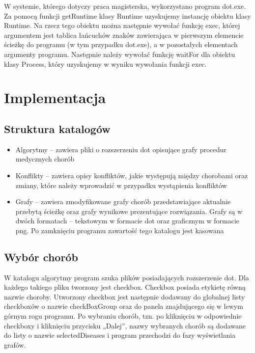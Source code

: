 \documentclass[oneside,a4paper]{book}
\begin{document}
\begin{spacing}{1.5}
W systemie, którego dotyczy praca magisterska, wykorzystano program dot.exe. Za pomocą funkcji getRuntime klasy Runtime uzyskujemy instancję obiektu klasy Runtime. Na rzecz tego obiektu można następnie wywołać funkcję exec, której argumentem jest tablica łańcuchów znaków zawierająca w pierwszym elemencie ścieżkę do programu (w tym przypadku dot.exe), a w pozostałych elementach argumenty programu. Następnie należy wywołać funkcję waitFor dla obiektu klasy Process, który uzyskujemy w wyniku wywołania funkcji exec.

\chapter{Implementacja}

\section{Struktura katalogów}

\begin{itemize}
\item{Algorytmy – zawiera pliki o rozszerzeniu dot opisujące grafy procedur medycznych chorób}
\item{Konflikty – zawiera opisy konfliktów, jakie występują między chorobami oraz zmiany, które należy wprowadzić w przypadku wystąpienia konfliktów}
\item{Grafy – zawiera zmodyfikowane grafy chorób przedstawiające aktualnie przebytą ścieżkę oraz grafy wynikowe prezentujące rozwiązania. Grafy są w dwóch formatach – tekstowym w formacie dot oraz graficznym w formacie png. Po zamknięciu programu zawartość tego katalogu jest kasowana}
\end{itemize}

\section{Wybór chorób}

W katalogu algorytmy program szuka plików posiadających rozszerzenie dot. Dla każdego takiego pliku tworzony jest checkbox. Checkbox posiada etykietę równą nazwie choroby. Utworzony checkbox jest następnie dodawany do globalnej listy checkboxów o nazwie checkBoxGroup oraz do panela znajdującego się w lewym górnym rogu programu. Po wybraniu chorób, tzn. po kliknięciu w odpowiednie checkboxy i kliknięciu przycisku „Dalej”, nazwy wybranych chorób są dodawane do listy o nazwie selectedDiseases i program przechodzi do fazy wyświetlania grafów. 


\end{spacing}
\end{document}
